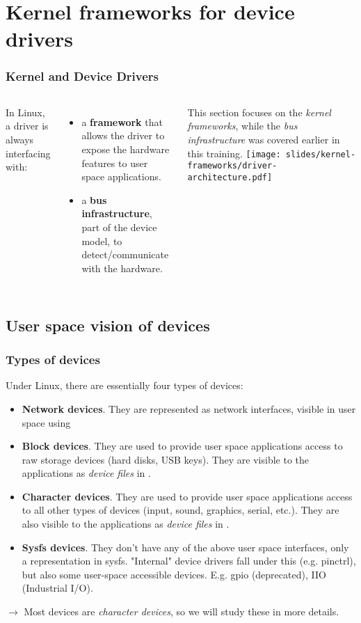 \section{Kernel frameworks for device drivers}

\begin{frame}
  \frametitle{Kernel and Device Drivers}
  \begin{columns}
     In Linux, a driver is always interfacing
    with:
    \begin{itemize}
    \item a {\bf framework} that allows the driver to expose the
      hardware features to user space applications.
    \item a {\bf bus infrastructure}, part of the device model, to
      detect/communicate with the hardware.
    \end{itemize}
    This section focuses on the {\em kernel frameworks}, while the
    {\em bus infrastructure} was covered earlier in this training.
    \texttt{[image: slides/kernel-frameworks/driver-architecture.pdf]}
  \end{columns}
\end{frame}

\subsection{User space vision of devices}

\begin{frame}
  \frametitle{Types of devices} Under Linux, there are essentially
  four types of devices:
  \begin{itemize}
  \item {\bf Network devices}. They are represented as network
    interfaces, visible in user space using 
  \item {\bf Block devices}. They are used to provide user space
    applications access to raw storage devices (hard disks, USB
    keys). They are visible to the applications as {\em device files}
    in .
  \item {\bf Character devices}. They are used to provide user space
    applications access to all other types of devices (input, sound,
    graphics, serial, etc.). They are also visible to the applications
    as {\em device files} in .
  \item {\bf Sysfs devices}. They don't have any of the above user space
    interfaces, only a representation in sysfs. "Internal" device drivers
    fall under this (e.g. pinctrl), but also some user-space accessible
    devices. E.g. gpio (deprecated), IIO (Industrial I/O).
  \end{itemize}
  $\rightarrow$ Most devices are {\em character devices}, so we will
  study these in more details.
\end{frame}

